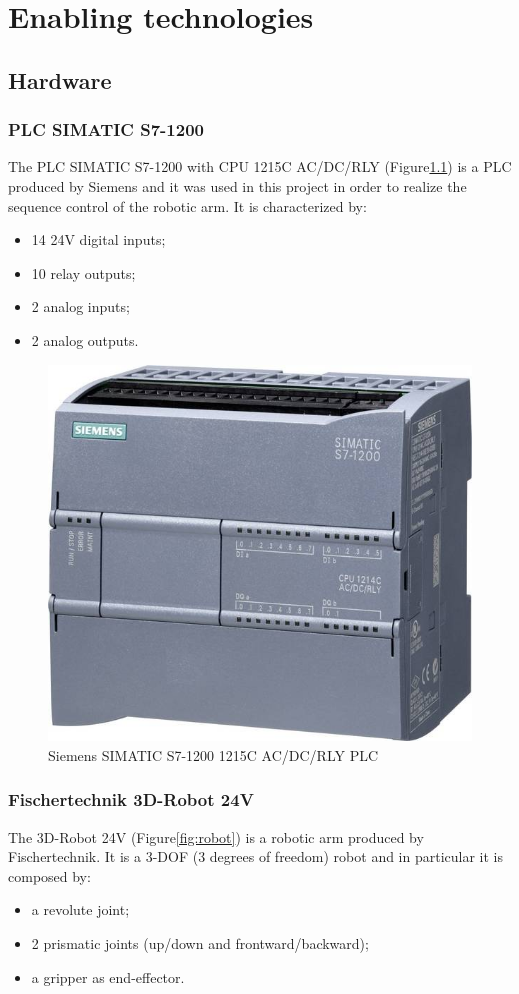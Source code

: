 \chapter{Enabling technologies} \label{2cap:design}
%

\section{Hardware}

\subsection{PLC SIMATIC S7-1200}
The PLC SIMATIC S7-1200 with CPU 1215C AC/DC/RLY (Figure\ref{fig:plc}) is a PLC produced by Siemens and it was used in this project in order to realize the sequence control of the robotic arm. \newline
It is characterized by:
\begin{itemize}
    \item 14 24V digital inputs;
    \item 10 relay outputs;
    \item 2 analog inputs;
    \item 2 analog outputs.
\end{itemize} 

\begin{figure}[!h]
\begin{center}
\includegraphics[width=0.4\linewidth]{capitolo2/figure/plc.jpeg}
\caption{Siemens SIMATIC S7-1200 1215C AC/DC/RLY PLC}
\label{fig:plc}
\end{center}
\end{figure}

\subsection{Fischertechnik 3D-Robot 24V}

The 3D-Robot 24V (Figure\ref{fig:robot}) is a robotic arm produced by Fischertechnik. It is a 3-DOF (3 degrees of freedom) robot and in particular it is composed by:
\begin{itemize}
    \item a revolute joint;
    \item 2 prismatic joints (up/down and frontward/backward);
    \item a gripper as end-effector.
\end{itemize}

